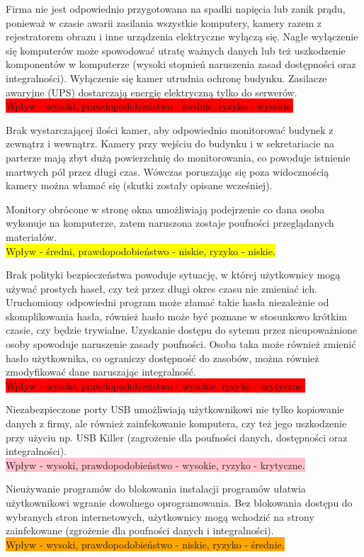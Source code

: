 Firma nie jest odpowiednio przygotowana na spadki napięcia lub zanik prądu, ponieważ w czasie awarii zasilania wszystkie komputery, kamery \linebreak razem z rejestratorem obrazu i inne urządzenia elektryczne wyłączą się. Nagłe wyłączenie się komputerów może spowodować utratę ważnych danych lub też uszkodzenie komponentów w komputerze (wysoki stopnień naruszenia zasad dostępności oraz integralności). Wyłączenie się kamer utrudnia ochronę budynku. Zasilacze awaryjne (UPS) dostarczają energię elektryczną tylko do serwerów. \\ \colorbox{red}{Wpływ - wysoki, prawdopodobieństwo - średnie, ryzyko - wysokie.}

Brak wystarczającej ilości kamer, aby odpowiednio monitorować budynek z zewnątrz i wewnątrz. Kamery przy wejściu do budynku i w sekretariacie na parterze mają zbyt dużą powierzchnię do monitorowania, co powoduje istnienie martwych pól przez długi czas. Wówczas poruszając się poza widocznością kamery można włamać się (skutki zostały opisane wcześniej). 

Monitory obrócone w stronę okna umożliwiają podejrzenie co dana osoba wykonuje na komputerze, zatem naruszona zostaje poufności przeglądanych materiałów. \\ \colorbox{yellow}{Wpływ - średni, prawdopodobieństwo - niskie, ryzyko - niskie.}

Brak polityki bezpieczeństwa powoduje sytuację, w której użytkownicy mogą używać prostych haseł, czy też przez długi okres czasu nie zmieniać ich. Uruchomiony odpowiedni program może złamać takie hasła niezależnie od skomplikowania hasła, również hasło może być poznane w stosunkowo krótkim czasie, czy będzie trywialne. Uzyskanie dostępu do sytemu przez nieupoważnione osoby spowoduje naruszenie zasady poufności. Osoba taka może również zmienić hasło użytkownika, co ograniczy dostępność do zasobów, można również zmodyfikować dane naruszając integralność. \\  \colorbox{red}{Wpływ - wysoki, prawdopodobieństwo - wysokie, ryzyko - krytyczne.}

Niezabezpieczone porty USB umożliwiają użytkownikowi nie tylko kopiowanie danych z firmy, ale również zainfekowanie komputera, czy też jego uszkodzenie przy użyciu np. USB Killer (zagrożenie dla poufności danych, dostępności oraz integralności). \\ \colorbox{pink}{Wpływ - wysoki, prawdopodobieństwo - wysokie, ryzyko - krytyczne.}

Nieużywanie programów do blokowania instalacji programów ułatwia użytkownikowi wgranie dowolnego oprogramowania. Bez blokowania  dostępu do wybranych stron internetowych, użytkownicy mogą wchodzić na strony zainfekowane (zgrożenie dla poufności danych i integralności). \\ \colorbox{orange}{Wpływ - wysoki, prawdopodobieństwo - niskie, ryzyko - średnie.} 

